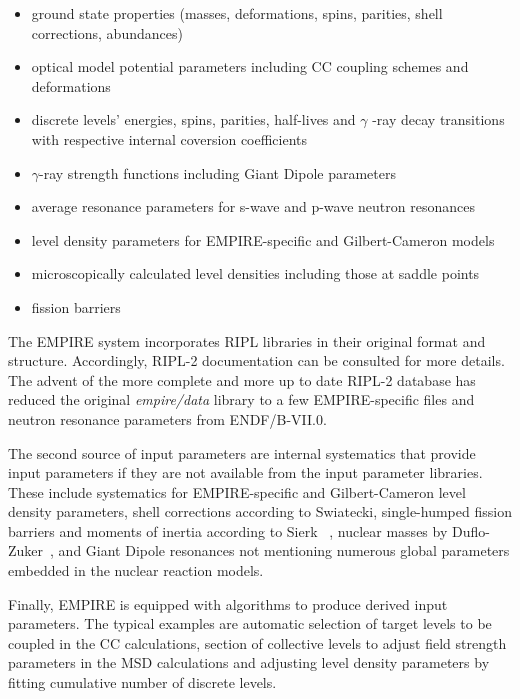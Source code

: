 \begin{itemize}
\item ground state properties (masses, deformations, spins, parities, shell
corrections, abundances)

\item optical model potential parameters including CC coupling schemes and
deformations

\item discrete levels' energies, spins, parities, half-lives and $\gamma$%
-ray decay transitions with respective internal coversion coefficients

\item $\gamma$-ray strength functions including Giant Dipole parameters

\item average resonance parameters for s-wave and p-wave neutron resonances

\item level density parameters for EMPIRE-specific and Gilbert-Cameron models

\item microscopically calculated level densities including those at saddle
points

\item fission barriers
\end{itemize}

The EMPIRE system incorporates RIPL libraries in their original format and
structure. Accordingly, RIPL-2 documentation can be consulted for more
details. The advent of the more complete and more up to date RIPL-2 database
has reduced the original \emph{empire/data} library to a few EMPIRE-specific
files and neutron resonance parameters from ENDF/B-VII.0.

The second source of input parameters are internal systematics that provide
input parameters if they are not available from the input parameter
libraries. These include systematics for EMPIRE-specific and Gilbert-Cameron
level density parameters, shell corrections according to Swiatecki,
single-humped fission barriers and moments of inertia according to Sierk~%
\cite{sierk}, nuclear masses by Duflo-Zuker~\cite{Duflo:96}, and Giant
Dipole resonances not mentioning numerous global parameters embedded in the
nuclear reaction models.

Finally, EMPIRE is equipped with algorithms to produce derived input
parameters. The typical examples are automatic selection of target levels to
be coupled in the CC calculations, section of collective levels to adjust
field strength parameters in the MSD calculations and adjusting level
density parameters by fitting cumulative number of discrete levels.

